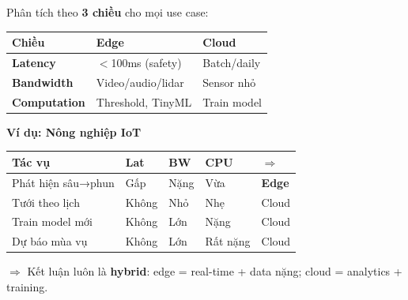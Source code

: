 \documentclass[9pt,a4paper,twocolumn]{article}
\begin{document}
\begin{tcolorbox}[deepbox, title={Edge vs Cloud --- Framework ra quyết định}]

Phân tích theo \textbf{3 chiều} cho mọi use case:

\begin{tabular}{@{}p{1.6cm}p{1.8cm}p{2.0cm}@{}}
\toprule
\scriptsize Chiều & \scriptsize Edge & \scriptsize Cloud \\
\midrule
\scriptsize \textbf{Latency} & \scriptsize $<$100ms (safety) & \scriptsize Batch/daily \\
\scriptsize \textbf{Bandwidth} & \scriptsize Video/audio/lidar & \scriptsize Sensor nhỏ \\
\scriptsize \textbf{Computation} & \scriptsize Threshold, TinyML & \scriptsize Train model \\
\bottomrule
\end{tabular}

\vspace{3pt}
\textbf{Ví dụ: Nông nghiệp IoT}

\begin{tabular}{@{}p{2.4cm}p{0.8cm}p{0.8cm}p{0.5cm}p{0.6cm}@{}}
\toprule
\scriptsize Tác vụ & \scriptsize Lat & \scriptsize BW & \scriptsize CPU & \scriptsize $\Rightarrow$ \\
\midrule
\scriptsize Phát hiện sâu→phun & \scriptsize Gấp & \scriptsize Nặng & \scriptsize Vừa & \scriptsize \textbf{Edge} \\
\scriptsize Tưới theo lịch & \scriptsize Không & \scriptsize Nhỏ & \scriptsize Nhẹ & \scriptsize Cloud \\
\scriptsize Train model mới & \scriptsize Không & \scriptsize Lớn & \scriptsize Nặng & \scriptsize Cloud \\
\scriptsize Dự báo mùa vụ & \scriptsize Không & \scriptsize Lớn & \scriptsize Rất nặng & \scriptsize Cloud \\
\bottomrule
\end{tabular}

\vspace{3pt}
$\Rightarrow$ Kết luận luôn là \textbf{hybrid}: edge = real-time + data nặng; cloud = analytics + training.

\end{tcolorbox}
\end{document}
